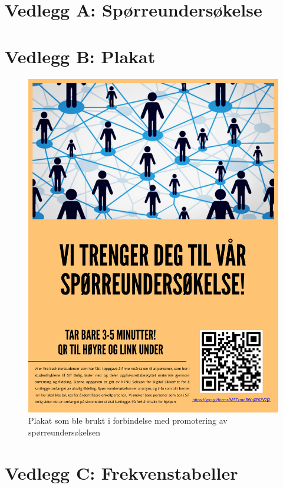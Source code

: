 \chapter*{Vedlegg A: Spørreundersøkelse}

\label{undersokelse}

\chapter*{Vedlegg B: Plakat}
\label{plakat}
\begin{figure}[H]
    \centering
    \includegraphics[scale=0.25]{case_1/bilder/plakat.pdf}
    \caption[Plakat]{Plakat som ble brukt i forbindelse med promotering av spørreundersøkelsen}
    \label{fig:plakat}
\end{figure}

\chapter*{Vedlegg C: Frekvenstabeller}
\label{frekvens}

